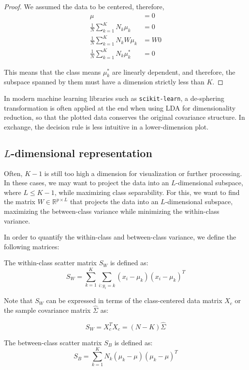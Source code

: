 \begin{proof}
We assumed the data to be centered, therefore,
\begin{align*}
\mu &= 0 \\
\frac{1}{N} \sum_{k=1}^K N_k \mu_k &= 0 \\
\frac{1}{N} \sum_{k=1}^K N_k W\mu_k &= W0 \\
\frac{1}{N} \sum_{k=1}^K N_k \mu_k^* & = 0
\end{align*}

This means that the class means $\mu_k^*$ are linearly dependent, and therefore, the subspace spanned by them must have a dimension strictly less than $K$.
\end{proof}

In modern machine learning libraries such as \texttt{scikit-learn}, a de-sphering transformation is often applied at the end when using LDA for dimensionality reduction, so that the plotted data conserves the original covariance structure. In exchange, the decision rule is less intuitive in a lower-dimension plot.

\subsection{$L$-dimensional representation}
Often, $K-1$ is still too high a dimension for visualization or further processing. In these cases, we may want to project the data into an $L$-dimensional subspace, where $L \leq K-1$, while maximizing class separability. For this, we want to find the matrix $W \in \mathbb{R}^{p \times L}$ that projects the data into an $L$-dimensional subspace, maximizing the between-class variance while minimizing the within-class variance.

In order to quantify the within-class and between-class variance, we define the following matrices:

\begin{definition}
The within-class scatter matrix $S_W$ is defined as:
\[
S_W = \sum_{k=1}^K \sum_{i: y_i = k} (x_i - \mu_k)(x_i - \mu_k)^T
\]
\end{definition}

Note that $S_W$ can be expressed in terms of the class-centered data matrix $X_c$ or the sample covariance matrix $\hat{\Sigma}$ as:

\[
S_W = X_c^T X_c = (N - K) \hat{\Sigma}
\]

\begin{definition}
The between-class scatter matrix $S_B$ is defined as:
\[
S_B = \sum_{k=1}^K N_k (\mu_k - \mu)(\mu_k - \mu)^T
\]
\end{definition}

